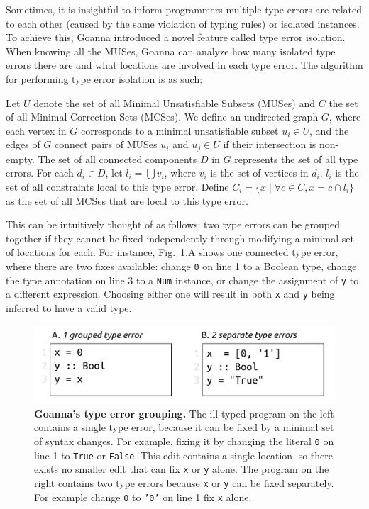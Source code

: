 \documentclass[pdflatex,lineno,sn-nature,Numbered]{sn-jnl}%
\begin{document}
Sometimes, it is insightful to inform programmers multiple type errors are related to each other (caused by the same violation of typing rules) or isolated instances. To achieve this, Goanna introduced a novel feature called type error isolation. When knowing all the MUSes, Goanna can analyze how many isolated type errors there are and what locations are involved in each type error. The algorithm for performing type error isolation is as such:


	Let $U$ denote the set of all Minimal Unsatisfiable Subsets (MUSes) and $C$ the set of all Minimal Correction Sets (MCSes). We define an undirected graph $G$, where each vertex in $G$ corresponds to a minimal unsatisfiable subset $u_i \in U$, and the edges of $G$ connect pairs of MUSes $u_i$ and $u_j \in U$ if their intersection is non-empty. The set of all connected components $D$ in $G$ represents the set of all type errors. For each $d_i \in D$, let $l_i = \bigcup v_i$, where $v_i$ is the set of vertices in $d_i$. $l_i$ is the set of all constraints local to this type error. Define $C_i = \{ x \mid \forall c \in C, x = c \cap l_i \}$ as the set of all MCSes that are local to this type error.


    This can be intuitively thought of as follows: two type errors can be grouped together if they cannot be fixed independently through modifying a minimal set of locations for each. For instance, Fig.~\ref{fig:grouping-example}.A shows one connected type error, where there are two fixes available: change \texttt{0} on line 1 to a Boolean type, change the type annotation on line 3 to a \texttt{Num} instance, or change the assignment of \texttt{y} to a different expression. Choosing either one will result in both \texttt{x} and \texttt{y} being inferred to have a valid type.
    

   \begin{figure}[ht!]
        \centering
        \includegraphics[width=0.8\linewidth]{images/Grouping-Example}
        \caption[Goanna's type error grouping]{\textbf{Goanna's type error grouping.} The ill-typed program on the left contains a single type error, because it can be fixed by a minimal set of syntax changes. For example, fixing it by changing the literal \texttt{0} on line 1 to \texttt{True} or \texttt{False}. This edit contains a single location, so there exists no smaller edit that can fix \texttt{x} or \texttt{y} alone. The program on the right contains two type errors because \texttt{x} or \texttt{y} can be fixed separately. For example change \texttt{0} to \texttt{'0'} on line 1 fix \texttt{x} alone. }
        \label{fig:grouping-example}
    \end{figure}
\end{document}
